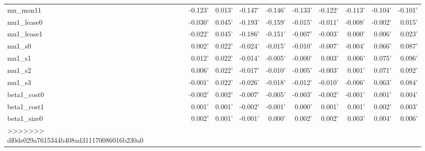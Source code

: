 \begin{tabular}{lrrrrrrrrr}
mu\_mon11     & -0.123' & 0.013' & -0.147' & -0.146' & -0.133' & -0.122' & -0.113' & -0.104' & -0.101' \\
mu1\_lease0   & -0.030' & 0.045' & -0.193' & -0.159' & -0.015' & -0.011' & -0.008' & -0.002' &  0.015' \\
mu1\_lease1   & -0.022' & 0.045' & -0.186' & -0.151' & -0.007' & -0.003' &  0.000' &  0.006' &  0.023' \\
mu1\_s0       &  0.002' & 0.022' & -0.024' & -0.015' & -0.010' & -0.007' & -0.004' &  0.066' &  0.087' \\
mu1\_s1       &  0.012' & 0.022' & -0.014' & -0.005' & -0.000' &  0.003' &  0.006' &  0.075' &  0.096' \\
mu1\_s2       &  0.006' & 0.022' & -0.017' & -0.010' & -0.005' & -0.003' &  0.001' &  0.071' &  0.092' \\
mu1\_s3       & -0.001' & 0.022' & -0.026' & -0.018' & -0.012' & -0.010' & -0.006' &  0.063' &  0.084' \\
beta1\_cost0  & -0.002' & 0.002' & -0.007' & -0.005' & -0.003' & -0.002' & -0.001' &  0.001' &  0.004' \\
beta1\_cost1  &  0.001' & 0.001' & -0.002' & -0.001' &  0.000' &  0.001' &  0.001' &  0.002' &  0.003' \\
beta1\_size0  &  0.002' & 0.001' & -0.001' &  0.000' &  0.002' &  0.002' &  0.003' &  0.004' &  0.006' \\
>>>>>>> df0de029a7615344b408ad311170086016b230a0
\bottomrule
\end{tabular}
